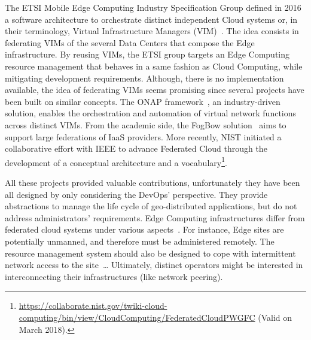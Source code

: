 


%
The ETSI Mobile Edge Computing Industry Specification Group
defined in 2016 a software architecture to orchestrate distinct
independent Cloud systems or, in their terminology, Virtual
Infrastructure Managers (VIM)~\cite{7574435}.
%
The idea consists in federating VIMs of the several Data Centers that
compose the Edge infrastructure.  By reusing VIMs, the ETSI group targets an Edge
Computing resource management that behaves in a same fashion as Cloud
Computing, while mitigating development requirements.
%
Although, there is no implementation available, the idea of federating
VIMs seems promising since several projects have been built on similar
concepts. The ONAP framework~\cite{onap}, an industry-driven solution,
enables the orchestration and automation of virtual network functions
across distinct VIMs. From the academic side, the FogBow
solution~\cite{brasileiro2016fogbow} aims to support large federations
of IaaS providers. More recently, NIST
initiated a collaborative effort with IEEE to advance Federated
Cloud through the development of a conceptual architecture and a
vocabulary\footnote{\url{https://collaborate.nist.gov/twiki-cloud-computing/bin/view/CloudComputing/FederatedCloudPWGFC}
  (Valid on March 2018).}.

All these projects provided valuable contributions, unfortunately they have
been all designed by only considering the DevOps' perspective. They provide
abstractions to manage the life cycle of geo-distributed applications,
but do not address administrators' requirements.
%
Edge Computing infrastructures differ from federated cloud systems
under various aspects~\cite{openstack:whitepaper}.  For instance, Edge
sites are potentially unmanned, and therefore must be administered
remotely. The resource management system should also be designed to
cope with intermittent network access to the site~\ldots
%
Ultimately, distinct operators might be interested in interconnecting their infrastructures (like network peering).
%

